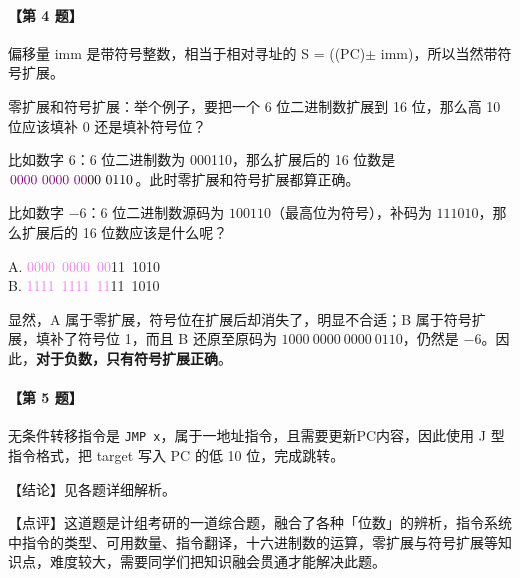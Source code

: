 \documentclass[UTF8]{ctexart}
\begin{document}
\paragraph{【第 4 题】} 偏移量 imm 是带符号整数，相当于相对寻址的 S = ((PC)$\pm$ imm)，所以当然带符号扩展。

\begin{tcolorbox}[colback=violet!5, colframe=violet, boxrule=1pt, ]
\small
零扩展和符号扩展：举个例子，要把一个 6 位二进制数扩展到 16 位，那么高 10 位应该填补 0 还是填补符号位？

比如数字 $6$：6 位二进制数为 000110，那么扩展后的 16 位数是 $\textcolor{violet}{0000\ 0000\ 00}00\ 0110$。此时零扩展和符号扩展都算正确。

比如数字 $-6$：6 位二进制数源码为 $100110$（最高位为符号），补码为 $111010$，那么扩展后的 16 位数应该是什么呢？

\begin{center}
    A. \textcolor{violet}{0000\ 0000\ 00}11\ 1010 \\
    B. \textcolor{violet}{1111\ 1111\ 11}11\ 1010
\end{center}
显然，A 属于零扩展，符号位在扩展后却消失了，明显不合适；B 属于符号扩展，填补了符号位 1，而且 B 还原至原码为 $1000\ 0000\ 0000\ 0110$，仍然是 $-6$。因此，\textbf{对于负数，只有符号扩展正确}。
\end{tcolorbox}

\paragraph{【第 5 题】} 无条件转移指令是 \verb!JMP x!，属于一地址指令，且需要更新PC内容，因此使用 J 型指令格式，把 target 写入 PC 的低 10 位，完成跳转。

\BgThispage
\vspace{1em}
{\color{cyan!80!black}
【结论】见各题详细解析。

【点评】这道题是计组考研的一道综合题，融合了各种「位数」的辨析，指令系统中指令的类型、可用数量、指令翻译，十六进制数的运算，零扩展与符号扩展等知识点，难度较大，需要同学们把知识融会贯通才能解决此题。
}
\end{document}
